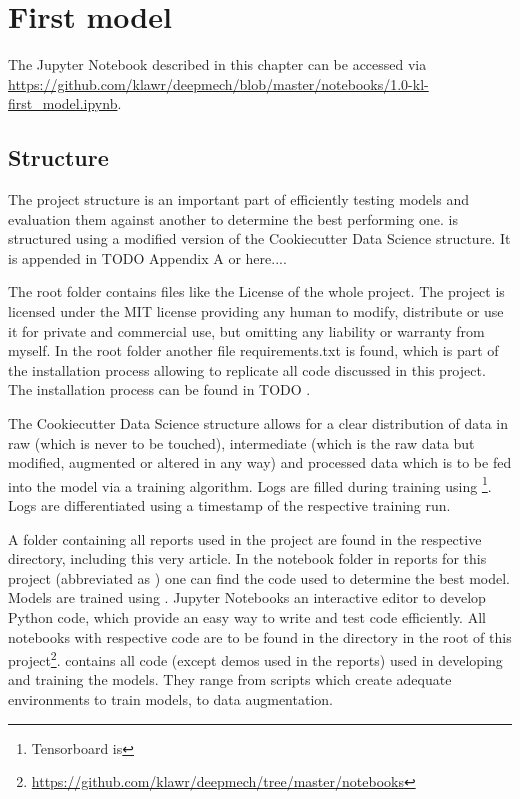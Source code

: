 \section{First model}

The Jupyter Notebook described in this chapter can be accessed via \url{https://github.com/klawr/deepmech/blob/master/notebooks/1.0-kl-first_model.ipynb}.

\subsection{Structure}
The project structure is an important part of efficiently testing models and evaluation them against another to determine the best performing one.
 is structured using a modified version of the Cookiecutter Data Science\cite{drivendata2019} structure. It is appended in TODO Appendix A or here....

The root folder contains files like the License of the whole project.
The project is licensed under the MIT license providing any human to modify, distribute or use it for private and commercial use, but omitting any liability or warranty from myself.
In the root folder another file requirements.txt is found, which is part of the installation process allowing to replicate all code discussed in this project.
The installation process can be found in TODO .

The Cookiecutter Data Science structure allows for a clear distribution of data in raw (which is never to be touched), intermediate (which is the raw data but modified, augmented or altered in any way) and processed data which is to be fed into the model via a training algorithm.
Logs are filled during training using \footnote{Tensorboard is }. Logs are differentiated using a timestamp of the respective training run.


A folder containing all reports used in the project are found in the respective directory, including this very article.
In the notebook folder in reports for this project (abbreviated as ) one can find the code used to determine the best model.
Models are trained using \cite{Jupyter2019}.
Jupyter Notebooks an interactive editor to develop Python code, which provide an easy way to write and test code efficiently.
All notebooks with respective code are to be found in the  directory in the root of this project\footnote{\url{https://github.com/klawr/deepmech/tree/master/notebooks}}.
 contains all code (except demos used in the reports) used in developing and training the models. They range from scripts which create adequate environments to train models, to data augmentation. %

